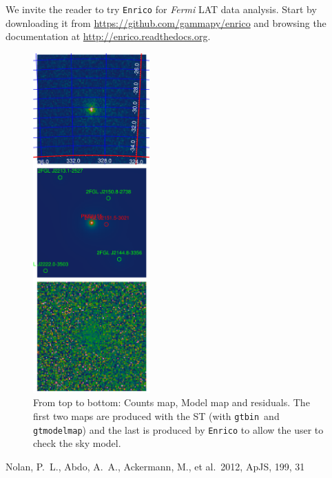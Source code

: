 \documentclass[a4paper]{article}
\newcommand{\Fermi}{\textit{Fermi} }
\begin{document}
We invite the reader to try {\tt Enrico} for \Fermi LAT data analysis.
Start by downloading it from \url{https://github.com/gammapy/enrico}
and browsing the documentation at \url{http://enrico.readthedocs.org}.

 \begin{figure}[t]
  \centering
  \includegraphics[width=0.4\textwidth]{icrc2013_89_06}
  \caption{From top to bottom: Counts map, Model map and residuals. The first two maps are produced with the ST (with {\tt gtbin} and {\tt gtmodelmap}) and the last is produced by {\tt Enrico} to allow the user to check the sky model.}
  \label{fig:Map}
 \end{figure}


\begin{thebibliography}{}


 Nolan, P.~L., Abdo, A.~A., Ackermann, M., et al.\ 2012, ApJS, 199, 31 

\end{thebibliography}
\end{document}
